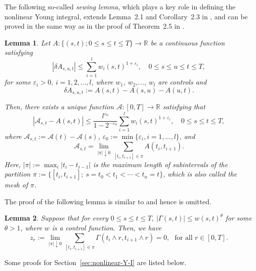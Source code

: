 \documentclass[11pt,reqno]{amsart}
\newtheorem{lemma}{Lemma}[section]
\numberwithin{equation}{section}
\begin{document}
The following so-called  \emph{sewing lemma}, which plays a key role in defining the nonlinear Young integral, extends Lemma~2.1 and Corollary~2.3 in \cite{feyel}, and can be proved in the same way as in the proof of Theorem~2.5 in \cite{FrizZhang-2018}. 
\begin{lemma}\label{lem:sewing} 
Let $A: \{(s, t); 0 \leq s \le t \leq T\} \rightarrow \mathbb{R}$ be a continuous function satisfying
\begin{equation*}
|\delta A_{s,u,t}| \le \sum_{i = 1}^{l} w_{i}(s,t)^{1+\varepsilon_{i}},\quad 0\le s\le u\le t \le T,
\end{equation*}
for some $\varepsilon_{i}>0,\ i=1,2,...,l$, where $w_{1}$, $w_{2}$,..., $w_{l}$ are controls and $$\delta A_{s,u,t} := A(s,t) - A(s,u) - A(u,t).$$ 

Then, there exists a unique function $\mathcal{A}: [0,T]\rightarrow \mathbb{R}$ satisfying that
\begin{equation*}
|\mathcal{A}_{s,t} - A(s,t)|\le \frac{l^{\varepsilon_{0}}}{1-2^{-\varepsilon_{0}}}\sum_{i = 1}^{l} w_{i}(s,t)^{1+\varepsilon_{i}},\quad  0 \le s \le t \le T,
\end{equation*}
where $\mathcal{A}_{s,t} := \mathcal{A}(t) - \mathcal{A}(s)$, $\varepsilon_{0} := \min\{\varepsilon_{i}, i=1, \dots, l\}$,
and \[\mathcal{A}_{s,t}=\lim_{|\pi|\downarrow 0} \sum\limits_{[t_{i},t_{i+1}]\in\pi} A(t_{i}, t_{i+1}).\] Here, $|\pi|:=\max_{i}|t_i-t_{i-1}|$  is the maximum length of subintervals of the partition $\pi:=\{[t_i,t_{i+1}] ;\  s=t_0<t_1<\cdots<t_n=t\}$, which is also called the mesh of $\pi$. 
\end{lemma}

The proof of the following lemma is similar to \cite[Proposition~5.2]{FrizVictoir} and hence is omitted. 
\begin{lemma}\label{lem:control's property}
Suppose that for every $0\le s \le t \le T$, $|\Gamma(s,t)|\le w(s,t)^{\theta}$ for some $\theta > 1$, where $w$ is a control function.  Then, we have
\[z_{r} := \lim_{|\pi|\downarrow 0}\sum_{[t_{i},t_{i+1}]\in\pi} \Gamma(t_{i}\land r,t_{i+1}\land r)=0,\ \ \ \text{for all }r\in[0,T].
\] 
\end{lemma}


Some proofs for Section~\ref{sec:nonlinear-Y-I} are listed below.
\end{document}
